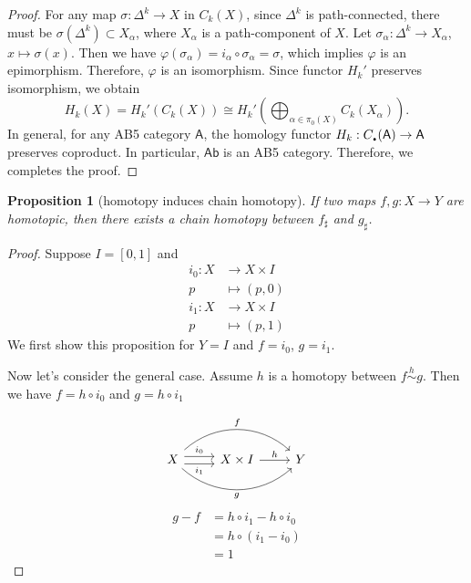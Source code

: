\documentclass{report}
\newtheorem{proposition}{Proposition}[section]
\theoremstyle{nonumberplain}
\newtheorem{proof}{Proof.}
\begin{document}
\begin{proof}
	For any map $\sigma:\Delta^k\to X$ in $C_k(X)$, since $\Delta^k$ is path-connected, there must be $\sigma(\Delta^k)\subset X_\alpha$, where $X_\alpha$ is a path-component of $X$. Let $\sigma_\alpha:\Delta^k\to X_\alpha$, $x\mapsto\sigma(x)$. Then we have $\varphi(\sigma_\alpha)=i_\alpha\circ\sigma_\alpha=\sigma$, which implies $\varphi$ is an epimorphism. Therefore, $\varphi$ is an isomorphism. Since functor $H_k'$ preserves isomorphism, we obtain
	$$
	H_k(X)=H_k'(C_k(X))\cong H_k'\left(\bigoplus_{\alpha\in \pi_0(X)} C_k\left(X_\alpha\right)\right).
	$$ 
	In general, for any AB5 category $\mathsf{A}$, the homology functor $H_k:C_\text{\hspace{-1pt}\huge$.$\hspace{-1pt}}(\mathsf{A})\to \mathsf{A}$ preserves coproduct. In particular, $\mathsf{Ab}$ is an AB5 category. Therefore, we completes the proof.
\end{proof}

\begin{proposition}[homotopy induces chain homotopy]
	If two maps $f,g :X\to Y$ are homotopic, then there exists a chain homotopy between $f_\sharp$ and $g_\sharp$.
\end{proposition}
\begin{proof}
	Suppose $I=[0,1]$ and
	\begin{align*}
		i_0: X &\longrightarrow X\times I\\
		p&\longmapsto (p,0)
	\end{align*}
	\begin{align*}
		i_1: X &\longrightarrow X\times I\\
		p&\longmapsto (p,1)
	\end{align*}
	We first show this proposition for $Y=I$ and $f=i_0$, $g=i_1$. 
	
	
	Now let's consider the general case. Assume $h$ is a homotopy between $f\overset{h}{\sim} g$. Then we have $f=h\circ i_0$ and $g=h\circ i_1$
	
	\begin{equation*}
		\begin{tikzcd}		
			X \arrow[r, shift left=1.2, "i_0"]\arrow[r,shift right=1.2,"i_1"']  \arrow[rr, bend left=42, "f"{ above}] \arrow[rr, bend right=42, "g"{below}]
			& X\times I \arrow[r, "h"] & Y
		\end{tikzcd}			
	\end{equation*}
	\[
	\begin{aligned}
		g-f &= h\circ i_1 - h\circ i_0\\
		&= h\circ (i_1-i_0)\\
		&= 1
	\end{aligned}
	\]
\end{proof}
\end{document}

